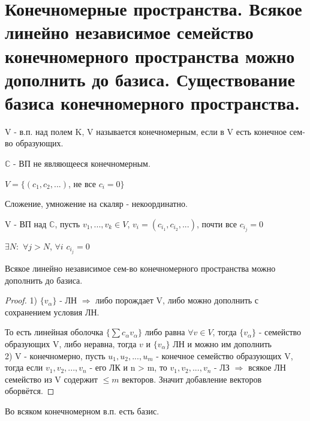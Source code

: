 \documentclass[algebra]{subfiles}
\begin{document}
    \section{Конечномерные пространства. Всякое линейно независимое семейство конечномерного пространства можно дополнить до базиса. Существование базиса конечномерного пространства.}

    \begin{definition}
        V - в.п. над полем K, V называется конечномерным, если в V есть конечное сем-во образующих.
    \end{definition}

    \begin{example}
        $\mathds{C}$ - ВП не являющееся конечномерным.

        $V=\{(c_1,c_2,...)$, не все $c_i=0\}$

        Сложение, умножение на скаляр - некоординатно.

        V - ВП над $\mathds{C}$, пусть $v_1,...,v_k \in V$, $v_i=(c_{i_1}, c_{i_2},...)$, почти все $c_{i_j}=0$

        $\exists N:$ $\forall j > N$, $\forall i$ $c_{i_j}=0$
    \end{example}

    \begin{theorem}
        Всякое линейно независимое сем-во конечномерного пространства можно дополнить до базиса.
    \end{theorem}

    \begin{proof}
        1) $\{v_\alpha\}$ - ЛН $\Rightarrow$ либо порождает V, либо можно дополнить с сохранением условия ЛН.

        То есть линейная оболочка $\{\sum c_\alpha v_\alpha\}$ либо равна $\forall v \in V$, тогда $\{v_\alpha\}$ - семейство образующих V, либо неравна, тогда $v$ и $\{v_\alpha\}$ ЛН и можно им дополнить
        \\
        2) V - конечномерно, пусть $u_1,u_2,...,u_m$ - конечное семейство образующих V, тогда если $v_1,v_2,...,v_n$ - его ЛК и n > m, то $v_1,v_2,...,v_n$ - ЛЗ $\Rightarrow$ всякое ЛН семейство из V содержит $\leqslant m$ векторов. Значит добавление векторов оборвётся.
    \end{proof}


    \begin{consequence}
        Во всяком конечномерном в.п. есть базис.
    \end{consequence}
\end{document}
